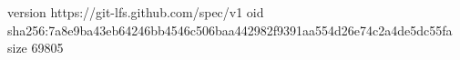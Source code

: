 version https://git-lfs.github.com/spec/v1
oid sha256:7a8e9ba43eb64246bb4546c506baa442982f9391aa554d26e74c2a4de5dc55fa
size 69805
